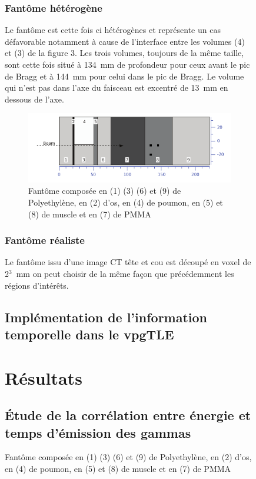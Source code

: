 \documentclass[11pt,a4paper,oldfontcommands]{memoir}
\begin{document}
\begin{figure}
\openany
\subsubsection{Fantôme hétérogène}

Le fantôme est cette fois ci hétérogènes et représente un cas défavorable notamment à cause de l'interface entre les volumes (4) et (3) de la figure 3. Les trois volumes, toujours de la même taille, sont cette fois situé à 134~mm de profondeur pour ceux avant le pic de Bragg et à 144~mm pour celui dans le pic de Bragg. Le volume qui n'est pas dans l'axe du faisceau est excentré de 13~mm en dessous de l'axe. 

\begin{figure}[h]
    \centering
    \includegraphics[scale = 0.3]{Parodi/heterofant.png}
    \caption{Fantôme composée en (1) (3) (6) et (9) de Polyethylène, en (2) d'os, en (4) de poumon, en (5) et (8) de muscle et en (7) de PMMA}
    \label{hetero phant}
\end{figure}{}

\subsubsection{Fantôme réaliste}

Le fantôme issu d'une image CT tête et cou est découpé en voxel de 2$^3$~mm on peut choisir de la même façon que précédemment les régions d’intérêts.

\subsection{Implémentation de l'information temporelle dans le vpgTLE}


\section{Résultats}

\subsection{\'Etude de la corrélation entre énergie et temps d'émission des gammas}


\end{figure}
\end{document}
